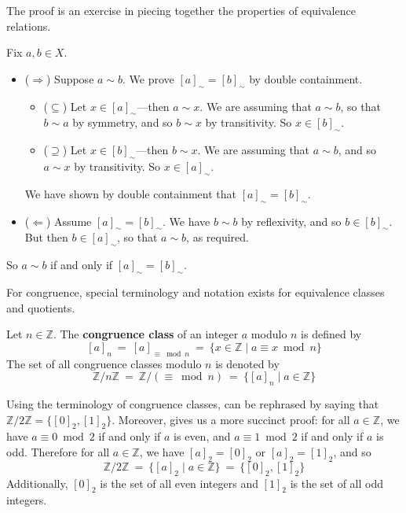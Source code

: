 \begin{cproof}
The proof is an exercise in piecing together the properties of equivalence relations.

Fix $a, b \in X$.
\begin{itemize}
\item ($\Rightarrow$) Suppose $a \sim b$. We prove $[a]_{\sim} = [b]_{\sim}$ by double containment.
\begin{itemize}
\item ($\subseteq$) Let $x \in [a]_{\sim}$---then $a \sim x$. We are assuming that $a \sim b$, so that $b \sim a$ by symmetry, and so $b \sim x$ by transitivity. So $x \in [b]_{\sim}$.
\item ($\supseteq$) Let $x \in [b]_{\sim}$---then $b \sim x$. We are assuming that $a \sim b$, and so $a \sim x$ by transitivity. So $x \in [a]_{\sim}$.
\end{itemize}
We have shown by double containment that $[a]_{\sim} = [b]_{\sim}$.

\item ($\Leftarrow$) Assume $[a]_{\sim} = [b]_{\sim}$. We have $b \sim b$ by reflexivity, and so $b \in [b]_{\sim}$. But then $b \in [a]_{\sim}$, so that $a \sim b$, as required.
\end{itemize}

So $a \sim b$ if and only if $[a]_{\sim} = [b]_{\sim}$.
\end{cproof}

For congruence, special terminology and notation exists for equivalence classes and quotients.

\begin{definition}
\label{defCongruenceClass}
Let $n \in \mathbb{Z}$. The \textbf{congruence class} of an integer $a$ modulo $n$ is defined by
\[ [a]_n ~=~ [a]_{\equiv \bmod n} ~=~ \{ x \in \mathbb{Z} \mid a \equiv x \bmod n \} \]
The set of all congruence classes modulo $n$ is denoted by
\[ \mathbb{Z}/n\mathbb{Z} ~=~ \mathbb{Z}/({\equiv \bmod n}) ~=~ \{ [a]_n \mid a \in \mathbb{Z} \} \]
\end{definition}

\begin{example}
Using the terminology of congruence classes,  can be rephrased by saying that $\mathbb{Z}/2\mathbb{Z} = \{ [0]_2, [1]_2 \}$. Moreover,  gives us a more succinct proof: for all $a \in \mathbb{Z}$, we have $a \equiv 0 \bmod 2$ if and only if $a$ is even, and $a \equiv 1 \bmod 2$ if and only if $a$ is odd. Therefore for all $a \in \mathbb{Z}$, we have $[a]_2 = [0]_2$ or $[a]_2 = [1]_2$, and so
\[ \mathbb{Z}/2\mathbb{Z} ~=~ \{ [a]_2 \mid a \in \mathbb{Z} \} ~=~ \{ [0]_2, [1]_2 \} \]
Additionally, $[0]_2$ is the set of all even integers and $[1]_2$ is the set of all odd integers.
\end{example}

